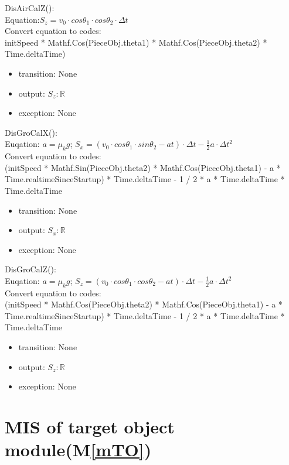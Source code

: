 \documentclass[12pt, titlepage]{article}
\newcommand{\mref}[1]{M\ref{#1}}
\begin{document}
\noindent DisAirCalZ():\\
Equation:$S_{z}=v_{0}\cdot cos\theta _{1}\cdot cos\theta _{2}\cdot \Delta t$\\
Convert equation to codes:\\
initSpeed * Mathf.Cos(PieceObj.theta1) * Mathf.Cos(PieceObj.theta2) * Time.deltaTime)
\begin{itemize}
	\item transition: None
	\item output: $S_{z}: \mathbb{R}$ 
	\item exception: None
\end{itemize}

\noindent DisGroCalX():\\
Euqation: $a=\mu_{k}g$; $S_{x}=(v_{0}\cdot cos\theta _{1}\cdot sin\theta _{2} - at)\cdot \Delta t-\frac{1}{2}a \cdot \Delta t^{2}$\\
Convert equation to codes:\\
(initSpeed * Mathf.Sin(PieceObj.theta2) * Mathf.Cos(PieceObj.theta1) - a * Time.realtimeSinceStartup) * Time.deltaTime - 1 / 2 * a * Time.deltaTime * Time.deltaTime
\begin{itemize}
	\item transition: None
	\item output: $S_{x}: \mathbb{R}$ 
	\item exception: None 
\end{itemize}

\noindent DisGroCalZ():\\
Euqation: $a=\mu_{k}g$; $S_{z}=(v_{0}\cdot cos\theta _{1}\cdot cos\theta _{2} - at)\cdot \Delta t-\frac{1}{2}a \cdot \Delta t^{2}$\\
Convert equation to codes:\\
(initSpeed * Mathf.Cos(PieceObj.theta2) * Mathf.Cos(PieceObj.theta1) - a * Time.realtimeSinceStartup) * Time.deltaTime - 1 / 2 * a * Time.deltaTime * Time.deltaTime
\begin{itemize}
	\item transition: None
	\item output: $S_{z}: \mathbb{R}$ 
	\item exception: None 
\end{itemize}

\section{MIS of target object module(\mref{mTO})}
\end{document}
